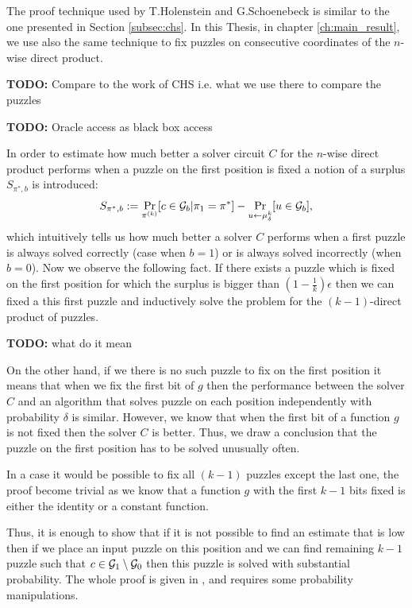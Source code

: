 The proof technique used by T.Holenstein and G.Schoenebeck is similar to the one presented in Section \ref{subsec:chs}.
In this Thesis, in chapter \ref{ch:main_result}, we use also the same technique to fix puzzles on consecutive coordinates of the $n$-wise direct product.

\begin{todo}
  \textbf{TODO:} Compare to the work of CHS i.e. what we use there to compare the puzzles
\end{todo}

\begin{todo}
  \textbf{TODO:} Oracle access as black box access
\end{todo}

In order to estimate how much better a solver circuit $C$ for the $n$-wise direct product performs when
a puzzle on the first position is fixed a notion of a surplus $S_{\pi^*, b}$ is introduced:
\begin{align*}
S_{\pi^*, b} := \Pr_{\pi^{(k)}} [ c \in \mathcal{G}_b | \pi_1 = \pi^* ] - \Pr_{u \leftarrow \mu_{\delta}^{k}} [u \in \mathcal{G}_b],
\end{align*}
which intuitively tells us how much better a solver $C$ performs when a first puzzle is always solved correctly (case when $b = 1$)
or is always solved incorrectly (when $b = 0$).
Now we observe the following fact. If there exists a puzzle which is fixed on the first position for which the surplus is bigger than
$(1 - \frac{1}{k})\epsilon$ then we can fixed a this first puzzle and inductively solve the problem for the $(k-1)$-direct product of puzzles.
\begin{todo}
  \textbf{TODO:} what do it mean
\end{todo}
On the other hand, if we there is no such puzzle to fix on the first position it means that when we fix the first bit of $g$ then
the performance between the solver $C$ and an algorithm that solves puzzle on each position independently with probability $\delta$
is similar. However, we know that when the first bit of a function $g$ is not fixed then the solver $C$ is better.
Thus, we draw a conclusion that the puzzle on the first position has to be solved unusually often.

In a case it would be possible to fix all $(k-1)$ puzzles except the last one, the proof become trivial as we know that a function
$g$ with the first $k-1$ bits fixed is either the identity or a constant function.

Thus, it is enough to show that if it is not possible to find an estimate that is low then
if we place an input puzzle on this position and we can find remaining $k-1$ puzzle such that
$c \in \mathcal{G}_1 \setminus \mathcal{G}_0$ then this puzzle is solved with substantial probability.
The whole proof is given in \cite{DBLP:journals/corr/abs-1002-3534}, and requires some probability manipulations.

